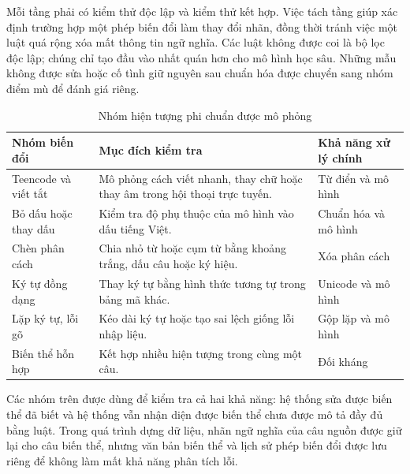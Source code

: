 \documentclass[12pt,a4paper]{article}
\begin{document}
Mỗi tầng phải có kiểm thử độc lập và kiểm thử kết hợp. Việc tách tầng giúp xác định trường hợp một phép biến đổi làm thay đổi nhãn, đồng thời tránh việc một luật quá rộng xóa mất thông tin ngữ nghĩa. Các luật không được coi là bộ lọc độc lập; chúng chỉ tạo đầu vào nhất quán hơn cho mô hình học sâu. Những mẫu không được sửa hoặc cố tình giữ nguyên sau chuẩn hóa được chuyển sang nhóm điểm mù để đánh giá riêng.

\begin{table}[H]
\centering
\caption{Nhóm hiện tượng phi chuẩn được mô phỏng}
\label{tab:perturbations}
\begin{tabularx}{\textwidth}{p{}p{}p{}}
\toprule
\textbf{Nhóm biến đổi} & \textbf{Mục đích kiểm tra} & \textbf{Khả năng xử lý chính}\\
\midrule
Teencode và viết tắt & Mô phỏng cách viết nhanh, thay chữ hoặc thay âm trong hội thoại trực tuyến. & Từ điển và mô hình\\
Bỏ dấu hoặc thay dấu & Kiểm tra độ phụ thuộc của mô hình vào dấu tiếng Việt. & Chuẩn hóa và mô hình\\
Chèn phân cách & Chia nhỏ từ hoặc cụm từ bằng khoảng trắng, dấu câu hoặc ký hiệu. & Xóa phân cách\\
Ký tự đồng dạng & Thay ký tự bằng hình thức tương tự trong bảng mã khác. & Unicode và mô hình\\
Lặp ký tự, lỗi gõ & Kéo dài ký tự hoặc tạo sai lệch giống lỗi nhập liệu. & Gộp lặp và mô hình\\
Biến thể hỗn hợp & Kết hợp nhiều hiện tượng trong cùng một câu. & Đối kháng\\
\bottomrule
\end{tabularx}
\end{table}

Các nhóm trên được dùng để kiểm tra cả hai khả năng: hệ thống sửa được biến thể đã biết và hệ thống vẫn nhận diện được biến thể chưa được mô tả đầy đủ bằng luật. Trong quá trình dựng dữ liệu, nhãn ngữ nghĩa của câu nguồn được giữ lại cho câu biến thể, nhưng văn bản biến thể và lịch sử phép biến đổi được lưu riêng để không làm mất khả năng phân tích lỗi.
\end{document}

